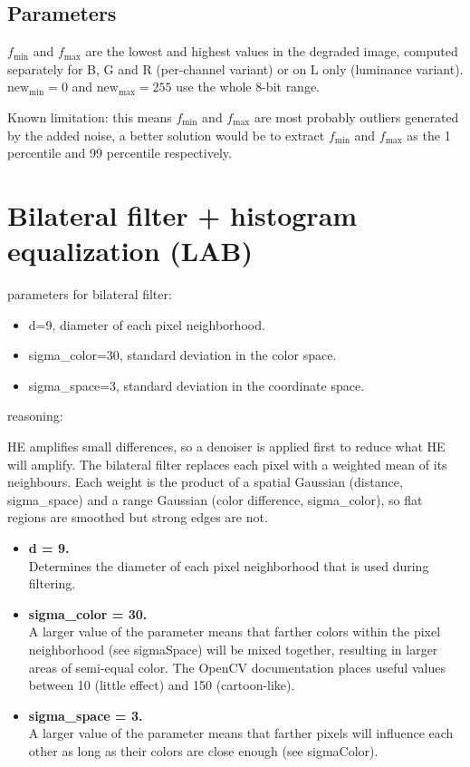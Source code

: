 \documentclass[11pt,a4paper]{article}
\begin{document}
\subsection{Parameters}

$f_{\min}$ and $f_{\max}$ are the lowest and highest values in the degraded image, computed separately for B, G and R (per-channel variant) or on L only (luminance variant). $\text{new}_{\min} = 0$ and $\text{new}_{\max} = 255$ use the whole 8-bit range.

Known limitation: this means $f_{\min}$ and $f_{\max}$ are most probably outliers generated by the added noise, a better solution would be to extract $f_{\min}$ and $f_{\max}$ as the 1 percentile and 99 percentile respectively.

\section{Bilateral filter + histogram equalization (LAB)}

parameters for bilateral filter:
\begin{itemize}
  \item d=9, diameter of each pixel neighborhood.
  \item sigma\_color=30, standard deviation in the color space.
  \item sigma\_space=3, standard deviation in the coordinate space.
\end{itemize}

reasoning:

HE amplifies small differences, so a denoiser is applied first to reduce what HE will amplify. The bilateral filter replaces each pixel with a weighted mean of its neighbours. Each weight is the product of a spatial Gaussian (distance, sigma\_space) and a range Gaussian (color difference, sigma\_color), so flat regions are smoothed but strong edges are not.

\begin{itemize}
  \item \textbf{d = 9.}\\
  Determines the diameter of each pixel neighborhood that is used during filtering.
  \item \textbf{sigma\_color = 30.}\\
  A larger value of the parameter means that farther colors within the pixel neighborhood (see sigmaSpace) will be mixed together, resulting in larger areas of semi-equal color.
  The OpenCV documentation places useful values between 10 (little effect) and 150 (cartoon-like).
  \item \textbf{sigma\_space = 3.}\\
  A larger value of the parameter means that farther pixels will influence each other as long as their colors are close enough (see sigmaColor).
\end{itemize}
\end{document}
